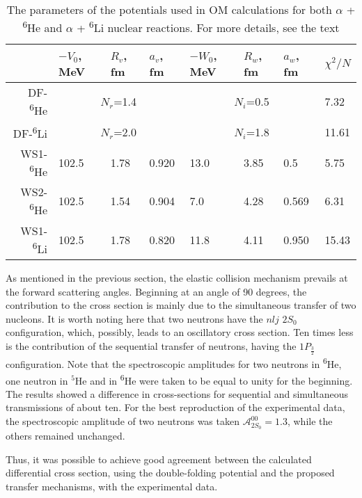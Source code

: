 \documentclass[
12pt, %
oneside, %
english, %
onehalfspacing, %
onehalfspacing, %
headsepline, %
]{MastersDoctoralThesis} %
\newcommand{\he}{\textsuperscript{6}He\xspace}
\newcommand{\li}{\textsuperscript{6}Li\xspace}
\begin{document}
\begin{table}[bp]
\footnotesize
\caption{The parameters of the potentials used in OM calculations for both $\alpha$ + \he and $\alpha$ + \li nuclear reactions. For more details, see the text}
\label{tab:he_elastic}
\begin{tabular*}{\textwidth}{@{\extracolsep{\fill}}rlllllll}
\hline
    & $-V_0$, MeV & $R_v$, fm & $a_v$, fm & $-W_0$, MeV & $R_w$, fm & $a_w$, fm & $\chi^2/N$ \\ \hline
DF-\he  & \multicolumn{3}{c}{$N_r$=1.4}        & \multicolumn{3}{c}{$N_i$=0.5}        & 7.32      \\
DF-\li  & \multicolumn{3}{c}{$N_r$=2.0}        & \multicolumn{3}{c}{$N_i$=1.8}        & 11.61      \\
WS1-\he & 102.5       & 1.78      & 0.920     & 13.0        & 3.85      & 0.5       & 5.75      \\
WS2-\he & 102.5       & 1.54      & 0.904     & 7.0         & 4.28      & 0.569     & 6.31      \\ 
WS1-\li & 102.5       & 1.78      & 0.820     & 11.8         & 4.11      & 0.950     & 15.43      \\
\hline
\end{tabular*}
\end{table}

As mentioned in the previous section, the elastic collision mechanism prevails at the forward scattering angles. Beginning at an angle of 90 degrees, the contribution to the cross section is mainly due to the simultaneous transfer of two nucleons. It is worth noting here that two neutrons have the $nlj$ $2S_0$ configuration, which, possibly, leads to an oscillatory cross section. Ten times less is the contribution of the sequential transfer of neutrons, having the $1P_{\frac{3}{2}}$ configuration. Note that the spectroscopic amplitudes for two neutrons in \he, one neutron in $^5$He and in \he were taken to be equal to unity for the beginning. The results showed a difference in cross-sections for sequential and simultaneous transmissions of about ten. For the best reproduction of the experimental data, the spectroscopic amplitude of two neutrons was taken  $\mathcal{A}^{00}_{2S_0}=1.3$, while the others remained unchanged.

Thus, it was possible to achieve good agreement between the calculated differential cross section, using the double-folding potential and the proposed transfer mechanisms, with the experimental data.
\end{document}
